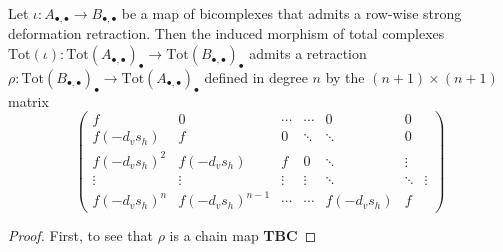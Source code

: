 \begin{prop}[label=prop:A5]
    Let $\iota:A_{\bullet,\bullet}\to B_{\bullet,\bullet}$ be a map of bicomplexes that admits a row-wise strong deformation retraction. Then the induced morphism of total complexes $\text{Tot}(\iota):\text{Tot}(A_{\bullet,\bullet})_\bullet\to\text{Tot}(B_{\bullet,\bullet})_{\bullet}$ admits a retraction $\rho:\text{Tot}(B_{\bullet,\bullet})_{\bullet}\to \text{Tot}(A_{\bullet,\bullet})_{\bullet}$ defined in degree $n$ by the $(n+1)\times (n+1)$ matrix
    \begin{equation*}
        \begin{pmatrix}
            f & 0 & \cdots & \cdots & 0 & 0 \\
            f(-d_vs_h) & f & 0 & \ddots & \ddots & 0 \\
            f(-d_vs_h)^2 & f(-d_vs_h) & f & 0 & \ddots & \vdots \\
            \vdots & \vdots & \vdots &\vdots & \ddots & \ddots & \vdots \\
            f(-d_vs_h)^n & f(-d_vs_h)^{n-1} & \cdots & \cdots & f(-d_vs_h) & f 
        \end{pmatrix}
    \end{equation*}
\end{prop}
\begin{proof}
    First, to see that $\rho$ is a chain map \textbf{TBC}
\end{proof}